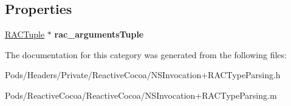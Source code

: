 \subsection*{Properties}
\begin{DoxyCompactItemize}
\item 
\mbox{\label{category_n_s_invocation_07_r_a_c_type_parsing_08_a2cf8127572bd10898fb6a8531865a4b4}} 
\mbox{\hyperlink{interface_r_a_c_tuple}{R\+A\+C\+Tuple}} $\ast$ {\bfseries rac\+\_\+arguments\+Tuple}
\end{DoxyCompactItemize}


The documentation for this category was generated from the following files\+:\begin{DoxyCompactItemize}
\item 
Pods/\+Headers/\+Private/\+Reactive\+Cocoa/N\+S\+Invocation+\+R\+A\+C\+Type\+Parsing.\+h\item 
Pods/\+Reactive\+Cocoa/\+Reactive\+Cocoa/N\+S\+Invocation+\+R\+A\+C\+Type\+Parsing.\+m\end{DoxyCompactItemize}
